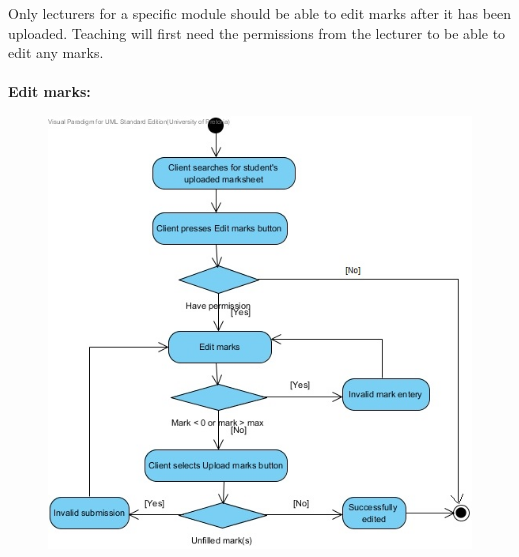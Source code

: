\documentclass[12pt,a4paper]{article}
\begin{document}
\newpage
Only lecturers for a specific module should be able to edit marks after it has been uploaded.  Teaching will first need the permissions from the lecturer to be able to edit any marks.\\
\\
\textbf {Edit marks:}
\begin{figure}[h]
\begin{center}
\includegraphics[scale=0.7]{./AndroidActivityDiagrams/ActivityDiagram6}
\end{center}
\end{figure}
\end{document}
